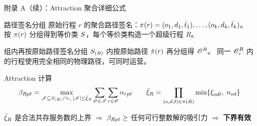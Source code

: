 \begin{frame}{附录 A（续）：Attraction 聚合详细公式}
\tiny
\begin{block}{路径签名分组}
原始行程 $r$ 的聚合路径签名：$\pi({r})=(o_1,d_1,\bar{t}_1),\ldots,(o_k,d_k,\bar{t}_k)$。
按 $\pi({r})$ 分组得到等价类 $S$，每个等价类构造一个超级行程 $R$。
\end{block}
\vspace{0.05cm}
\begin{block}{组内再按原始路径签名分组}
$S_{(R)}$ 内按原始路径 $\hat{\pi}({r})$ 再分组得 $\mathscr{O}^R$。
同一 $\mathscr{O}^R_r$ 内的行程使用完全相同的物理路径，可同时运营。
\end{block}
\vspace{0.05cm}
\begin{block}{Attraction 计算}
\vspace{-0.15cm}
\begin{equation*}
\beta_{Rp\ell} = \max_{\mathscr{I} \subseteq S_{(R)}/\hat{\sim},\;|\mathscr{I}|\le\bar{\xi}_R}
\sum_{\mathscr{O}\in\mathscr{I}}\sum_{r\in\mathscr{O}}\alpha_{rp\ell}
\qquad
\bar{\xi}_R = \prod_{(o,d,\bar{t})\in\pi({R})} \min\{\xi_{od\bar{t}},\;n_{od}\}
\end{equation*}
\end{block}
\vspace{0.05cm}
\begin{alertblock}{}
\centering\scriptsize
$\bar{\xi}_R$ 是合法共存服务数的上界 $\Rightarrow$ $\beta_{Rp\ell} \ge$ 任何可行整数解的吸引力 $\Rightarrow$ \textbf{下界有效}
\end{alertblock}
\end{frame}


